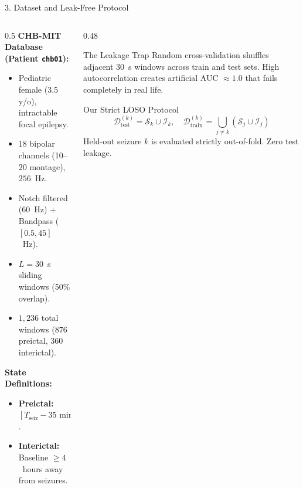 \documentclass[aspectratio=169,10pt]{beamer}
\begin{document}
\begin{frame}{3. Dataset and Leak-Free Protocol}
\begin{columns}[T]
\begin{column}{0.5\textwidth}
\textbf{CHB-MIT Database (Patient \texttt{chb01}):}
\begin{itemize}
    \item Pediatric female (3.5 y/o), intractable focal epilepsy.
    \item 18 bipolar channels (10--20 montage), $256$~Hz.
    \item Notch filtered ($60$~Hz) + Bandpass ($[0.5, 45]$~Hz).
    \item $L=30$~s sliding windows (50\% overlap).
    \item $1{,}236$ total windows ($876$ preictal, $360$ interictal).
\end{itemize}

\vspace{0.2cm}
\textbf{State Definitions:}
\begin{itemize}
    \item \textbf{Preictal:} $[T_{\text{seiz}}-35\text{ min}, T_{\text{seiz}}-5\text{ min}]$.
    \item \textbf{Interictal:} Baseline $\ge 4$~hours away from seizures.
\end{itemize}
\end{column}

\begin{column}{0.48\textwidth}
\begin{alertblock}{The Leakage Trap}
Random cross-validation shuffles adjacent $30$~s windows across train and test sets. High autocorrelation creates artificial AUC $\approx 1.0$ that fails completely in real life.
\end{alertblock}

\begin{block}{Our Strict LOSO Protocol}
\begin{equation*}
    \mathcal{D}_{\text{test}}^{(k)} = \mathcal{S}_k \cup \mathcal{I}_k, \quad \mathcal{D}_{\text{train}}^{(k)} = \bigcup_{j \ne k} (\mathcal{S}_j \cup \mathcal{I}_j)
\end{equation*}
Held-out seizure $k$ is evaluated strictly out-of-fold. Zero test leakage.
\end{block}
\end{column}
\end{columns}
\end{frame}
\end{document}
